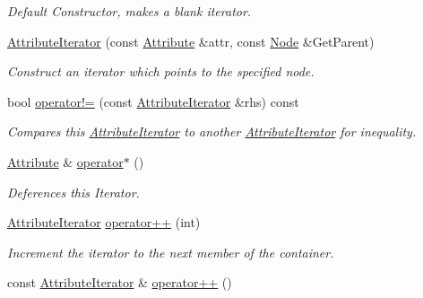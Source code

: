 \begin{DoxyCompactItemize}
\begin{DoxyCompactList}\small\item\em Default Constructor, makes a blank iterator. \item\end{DoxyCompactList}\item 
\hyperlink{classMezzanine_1_1xml_1_1AttributeIterator_a1566a30c968c519bc131cd5984767d03}{AttributeIterator} (const \hyperlink{classMezzanine_1_1xml_1_1Attribute}{Attribute} \&attr, const \hyperlink{classMezzanine_1_1xml_1_1Node}{Node} \&GetParent)
\begin{DoxyCompactList}\small\item\em Construct an iterator which points to the specified node. \item\end{DoxyCompactList}\item 
bool \hyperlink{classMezzanine_1_1xml_1_1AttributeIterator_a0b8ae1e67801035cd9bab5ebb4177ac3}{operator!=} (const \hyperlink{classMezzanine_1_1xml_1_1AttributeIterator}{AttributeIterator} \&rhs) const 
\begin{DoxyCompactList}\small\item\em Compares this \hyperlink{classMezzanine_1_1xml_1_1AttributeIterator}{AttributeIterator} to another \hyperlink{classMezzanine_1_1xml_1_1AttributeIterator}{AttributeIterator} for inequality. \item\end{DoxyCompactList}\item 
\hyperlink{classMezzanine_1_1xml_1_1Attribute}{Attribute} \& \hyperlink{classMezzanine_1_1xml_1_1AttributeIterator_a40753d29eaa7d4442b671b4e495c8cc4}{operator$\ast$} ()
\begin{DoxyCompactList}\small\item\em Deferences this Iterator. \item\end{DoxyCompactList}\item 
\hyperlink{classMezzanine_1_1xml_1_1AttributeIterator}{AttributeIterator} \hyperlink{classMezzanine_1_1xml_1_1AttributeIterator_a7ac3894577f9c30baa80e07b60e0b7bf}{operator++} (int)
\begin{DoxyCompactList}\small\item\em Increment the iterator to the next member of the container. \item\end{DoxyCompactList}\item 
\hypertarget{classMezzanine_1_1xml_1_1AttributeIterator_a2cd6308f92f601991fb7e8308d1e8f02}{
const \hyperlink{classMezzanine_1_1xml_1_1AttributeIterator}{AttributeIterator} \& \hyperlink{classMezzanine_1_1xml_1_1AttributeIterator_a2cd6308f92f601991fb7e8308d1e8f02}{operator++} ()}
\label{classMezzanine_1_1xml_1_1AttributeIterator_a2cd6308f92f601991fb7e8308d1e8f02}


\end{DoxyCompactItemize}
